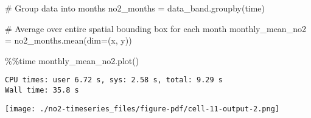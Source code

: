 \documentclass[
  letterpaper,
  DIV=11,
  numbers=noendperiod]{scrreprt}
\newenvironment{Shaded}{\begin{snugshade}}{\end{snugshade}}
\newcommand{\CommentTok}[1]{\textcolor[rgb]{0.37,0.37,0.37}{#1}}
\newcommand{\NormalTok}[1]{\textcolor[rgb]{0.00,0.46,0.62}{#1}}
\newcommand{\OperatorTok}[1]{\textcolor[rgb]{0.37,0.37,0.37}{#1}}
\newcommand{\StringTok}[1]{\textcolor[rgb]{0.13,0.47,0.30}{#1}}
\begin{document}
\begin{Shaded}
\begin{Highlighting}[]
\CommentTok{\# Group data into months}
\NormalTok{no2\_months }\OperatorTok{=}\NormalTok{ data\_band.groupby(}\StringTok{\textquotesingle{}time\textquotesingle{}}\NormalTok{)}
\end{Highlighting}
\end{Shaded}

\begin{Shaded}
\begin{Highlighting}[]
\CommentTok{\# Average over entire spatial bounding box for each month}
\NormalTok{monthly\_mean\_no2 }\OperatorTok{=}\NormalTok{ no2\_months.mean(dim}\OperatorTok{=}\NormalTok{(}\StringTok{\textquotesingle{}x\textquotesingle{}}\NormalTok{, }\StringTok{\textquotesingle{}y\textquotesingle{}}\NormalTok{))}
\end{Highlighting}
\end{Shaded}

\begin{Shaded}
\begin{Highlighting}[]
\OperatorTok{\%\%}\NormalTok{time}
\NormalTok{monthly\_mean\_no2.plot()}
\end{Highlighting}
\end{Shaded}

\begin{verbatim}
CPU times: user 6.72 s, sys: 2.58 s, total: 9.29 s
Wall time: 35.8 s
\end{verbatim}

\texttt{[image: ./no2-timeseries\_files/figure-pdf/cell-11-output-2.png]}
\end{document}
